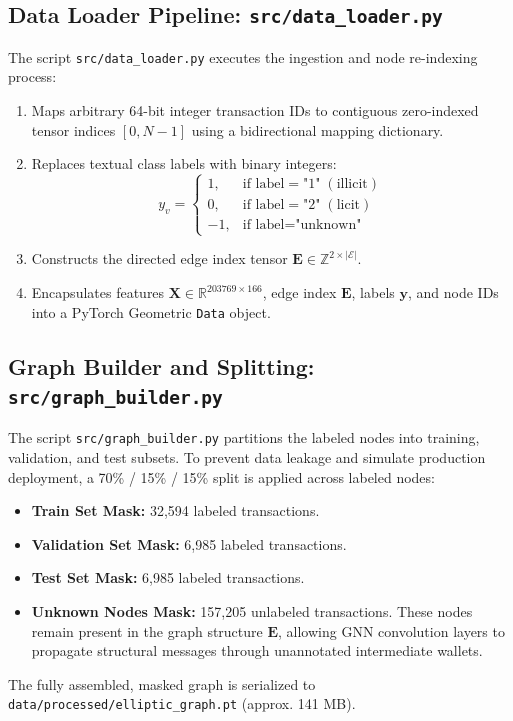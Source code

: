 \documentclass[11pt,a4paper]{report}
\begin{document}
\subsection{Data Loader Pipeline: \texttt{src/data\_loader.py}}
The script \texttt{src/data\_loader.py} executes the ingestion and node re-indexing process:
\begin{enumerate}[leftmargin=1.5em]
  \item Maps arbitrary 64-bit integer transaction IDs to contiguous zero-indexed tensor indices $[0, N-1]$ using a bidirectional mapping dictionary.
  \item Replaces textual class labels with binary integers:
  \[
  y_v = \begin{cases}
  1, & \text{if label} = \text{"1"} \;(\text{illicit}) \\
  0, & \text{if label} = \text{"2"} \;(\text{licit}) \\
  -1, & \text{if label} = \text{"unknown"}
  \end{cases}
  \]
  \item Constructs the directed edge index tensor $\mathbf{E} \in \mathbb{Z}^{2 \times |\mathcal{E}|}$.
  \item Encapsulates features $\mathbf{X} \in \mathbb{R}^{203769 \times 166}$, edge index $\mathbf{E}$, labels $\mathbf{y}$, and node IDs into a PyTorch Geometric \texttt{Data} object.
\end{enumerate}

\subsection{Graph Builder and Splitting: \texttt{src/graph\_builder.py}}
The script \texttt{src/graph\_builder.py} partitions the labeled nodes into training, validation, and test subsets. To prevent data leakage and simulate production deployment, a 70\% / 15\% / 15\% split is applied across labeled nodes:
\begin{itemize}[leftmargin=1.5em]
  \item \textbf{Train Set Mask:} 32,594 labeled transactions.
  \item \textbf{Validation Set Mask:} 6,985 labeled transactions.
  \item \textbf{Test Set Mask:} 6,985 labeled transactions.
  \item \textbf{Unknown Nodes Mask:} 157,205 unlabeled transactions. These nodes remain present in the graph structure $\mathbf{E}$, allowing GNN convolution layers to propagate structural messages through unannotated intermediate wallets.
\end{itemize}
The fully assembled, masked graph is serialized to \texttt{data/processed/elliptic\_graph.pt} (approx. 141 MB).
\end{document}

